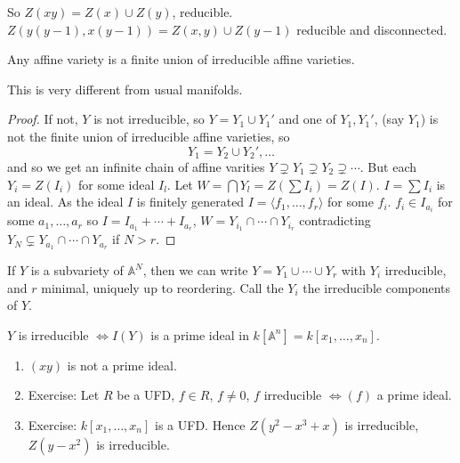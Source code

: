 \documentclass{article}
\newcommand{\A}{\mathbb{A}}
\begin{document}
So $Z(xy) = Z(x) \cup Z(y)$, reducible.
$Z(y(y-1), x(y-1)) = Z(x,y) \cup Z(y-1)$ reducible and disconnected.
\begin{prop}
    Any affine variety is a finite union of irreducible affine varieties.
\end{prop}
\begin{remark}
    This is very different from usual manifolds.
\end{remark}
\begin{proof}
    If not, $Y$ is not irreducible, so $Y = Y_1 \cup Y_1'$ and one of $Y_1, Y_1'$, (say $Y_1$) is not the finite union of irreducible affine varieties, so
    \begin{equation*}
        Y_1 = Y_2 \cup Y_2', \dotsc
    \end{equation*}
    and so we get an infinite chain of affine varities $Y \supsetneq Y_1 \supsetneq Y_2 \supsetneq \dotsb$.
    But each $Y_i = Z(I_i)$ for some ideal $I_l$. Let $W = \bigcap Y_l = Z(\sum I_i) = Z(I)$.
    $I = \sum I_i$ is an ideal. As the ideal $I$ is finitely generated $I = \langle f_1, \dotsc, f_r \rangle$ for some $f_i$.
    $f_i \in I_{a_i}$ for some $a_1, \dotsc, a_r$ so $I = I_{a_1} + \dotsb + I_{a_r}$, $W = Y_{i_1} \cap \dotsb \cap Y_{i_r}$ contradicting $Y_N \subsetneq Y_{a_1} \cap \dotsb \cap Y_{a_r}$ if $N > r$.
\end{proof}
\begin{ex}
    If $Y$ is a subvariety of $\A^N$, then we can write $Y = Y_1 \cup \dotsb \cup Y_r$ with $Y_i$ irreducible, and $r$ minimal, uniquely up to reordering. Call the $Y_i$ the irreducible components of $Y$.
\end{ex}
\begin{prop}
    $Y$ is irreducible $\iff I(Y)$ is a prime ideal in $k[\A^n] = k[x_1, \dotsc, x_n]$.
\end{prop}
\begin{eg}
    \leavevmode
    \begin{enumerate}[label=(\roman*)]
        \item $(x y)$ is not a prime ideal.
        \item Exercise: Let $R$ be a UFD, $f \in R$, $f \neq 0$, $f$ irreducible $\iff (f)$ a prime ideal.
        \item Exercise: $k[x_1, \dotsc, x_n]$ is a UFD.
            Hence $Z(y^2 - x^3 + x)$ is irreducible, $Z(y-x^2)$ is irreducible.
    \end{enumerate}
\end{eg}
\end{document}
